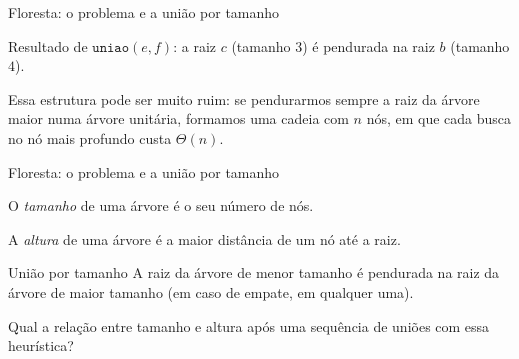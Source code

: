 \documentclass[aspectratio=169,10pt]{beamer}
\newcommand{\Uniao}{\mathtt{uniao}}
\begin{document}
\begin{frame}[t]{Floresta: o problema e a união por tamanho}
\vfill
  \begin{minipage}[c]{.5\linewidth}
    \centering

    {\footnotesize Resultado de $\Uniao(e,f)$: a raiz $c$ (tamanho $3$)
      é pendurada na raiz $b$ (tamanho $4$).}
  \end{minipage}
  \hfill
  \begin{minipage}[c]{.47\linewidth}
    Essa estrutura pode ser muito ruim: se pendurarmos sempre a raiz da
    árvore maior numa árvore unitária, formamos uma cadeia com $n$ nós,
    em que cada busca no nó mais profundo custa $\Theta(n)$.
  \end{minipage}

 \end{frame}

\begin{frame}[c]{Floresta: o problema e a união por tamanho}

  O \alert{\textit{tamanho}} de uma árvore é o seu número de nós.
  
  \vfill
  
  A \alert{\textit{altura}} de uma árvore é a maior distância de um nó
  até a raiz.
  
  \vfill
  
  \begin{block}{União por tamanho}
    A raiz da árvore de menor tamanho é pendurada na raiz da árvore de
    maior tamanho (em caso de empate, em qualquer uma).
  \end{block}

  \vfill
  
    Qual a relação entre tamanho e altura após uma sequência de uniões
    com essa heurística?  \vfill
  

\end{frame}
\end{document}
